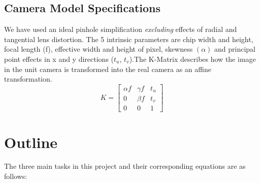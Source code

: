\documentclass[titlepage]{article}
\begin{document}
\subsection{Camera Model Specifications}
We have used an ideal pinhole simplification \textit{excluding} effects of radial and tangential lens distortion. The 5 intrinsic parameters are chip width and height, focal length (f), effective width and height of pixel, skewness $(\alpha)$ and principal point effects in x and y directions ($t_u$, $t_v$).The K-Matrix describes how the image in the unit camera is transformed into the real camera as an affine transformation.
%
\begin{equation} \label{KMatrix}
K=
  \begin{bmatrix}
  \alpha f & \gamma f & t_u \\ 
  0        & \beta f  & t_v \\ 
  0        &    0     &  1 
  \end{bmatrix}
\end{equation}
\section{Outline}
The three main tasks in this project and their corresponding equations are as follows:
\end{document}
